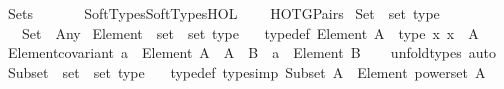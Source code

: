 %
\begin{isabellebody}%
%
%
\isadelimdocument
%
\endisadelimdocument
%
\isatagdocument
\isanewline
\isanewline
%
\isamarkuptrue%
%
\endisatagdocument
{\isafolddocument}%
%
\isadelimdocument
%
\endisadelimdocument
%
\isadelimtheory
%
\endisadelimtheory
%
\isatagtheory
{}\isamarkupfalse%
\ Sets\isanewline
\ \ \isanewline
\ \ \ \ Soft{\isacharunderscore}{\kern0pt}Types{\isachardot}{\kern0pt}Soft{\isacharunderscore}{\kern0pt}Types{\isacharunderscore}{\kern0pt}HOL\isanewline
\ \ \ \ HOTG{\isachardot}{\kern0pt}Pairs\isanewline
{}%
\endisatagtheory
{\isafoldtheory}%
%
\isadelimtheory
%
\endisadelimtheory
%
\isadelimdocument
%
\endisadelimdocument
%
\isatagdocument
%
\isamarkuptrue%
%
\endisatagdocument
{\isafolddocument}%
%
\isadelimdocument
%
\endisadelimdocument
{}\isamarkupfalse%
\ Set\ {\isacharcolon}{\kern0pt}{\isacharcolon}{\kern0pt}\ {\isachardoublequoteopen}set\ type{\isachardoublequoteclose}\isanewline
\ \ \ {\isachardoublequoteopen}Set\ {\isasymequiv}\ Any{\isachardoublequoteclose}\isanewline
\isanewline
{}\isamarkupfalse%
\ Element\ {\isacharcolon}{\kern0pt}{\isacharcolon}{\kern0pt}\ {\isachardoublequoteopen}set\ {\isasymRightarrow}\ set\ type{\isachardoublequoteclose}\isanewline
\ \ \ {\isacharbrackleft}{\kern0pt}typedef{\isacharbrackright}{\kern0pt}{\isacharcolon}{\kern0pt}\ {\isachardoublequoteopen}Element\ A\ {\isasymequiv}\ type\ {\isacharparenleft}{\kern0pt}{\isasymlambda}x{\isachardot}{\kern0pt}\ x\ {\isasymin}\ A{\isacharparenright}{\kern0pt}{\isachardoublequoteclose}\isanewline
\isanewline
{}\isamarkupfalse%
\ Element{\isacharunderscore}{\kern0pt}covariant{\isacharcolon}{\kern0pt}\ {\isachardoublequoteopen}a\ {\isacharcolon}{\kern0pt}\ Element\ A\ {\isasymLongrightarrow}\ A\ {\isasymsubseteq}\ B\ {\isasymLongrightarrow}\ a\ {\isacharcolon}{\kern0pt}\ Element\ B{\isachardoublequoteclose}\isanewline
%
\isadelimproof
\ \ %
\endisadelimproof
%
\isatagproof
{}\isamarkupfalse%
\ unfold{\isacharunderscore}{\kern0pt}types\ auto%
\endisatagproof
{\isafoldproof}%
%
\isadelimproof
\isanewline
%
\endisadelimproof
\isanewline
{}\isamarkupfalse%
\ Subset\ {\isacharcolon}{\kern0pt}{\isacharcolon}{\kern0pt}\ {\isachardoublequoteopen}set\ {\isasymRightarrow}\ set\ type{\isachardoublequoteclose}\isanewline
\ \ \ {\isacharbrackleft}{\kern0pt}typedef{\isacharcomma}{\kern0pt}\ type{\isacharunderscore}{\kern0pt}simp{\isacharbrackright}{\kern0pt}{\isacharcolon}{\kern0pt}\ {\isachardoublequoteopen}Subset\ A\ {\isasymequiv}\ Element\ {\isacharparenleft}{\kern0pt}powerset\ A{\isacharparenright}{\kern0pt}{\isachardoublequoteclose}\isanewline

\end{isabellebody}
